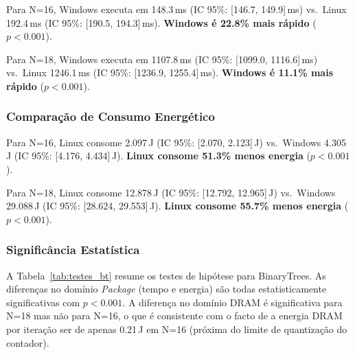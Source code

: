 \documentclass[12pt,a4paper]{article}
\begin{document}
Para N=16, Windows executa em 148.3\,ms (IC 95\%: [146.7, 149.9]\,ms) vs.\
Linux 192.4\,ms (IC 95\%: [190.5, 194.3]\,ms).
\textbf{Windows é 22.8\% mais rápido} ($p < 0.001$).

Para N=18, Windows executa em 1107.8\,ms (IC 95\%: [1099.0, 1116.6]\,ms) vs.\
Linux 1246.1\,ms (IC 95\%: [1236.9, 1255.4]\,ms).
\textbf{Windows é 11.1\% mais rápido} ($p < 0.001$).

\subsubsection{Comparação de Consumo Energético}

Para N=16, Linux consome 2.097\,J (IC 95\%: [2.070, 2.123]\,J) vs.\ Windows
4.305\,J (IC 95\%: [4.176, 4.434]\,J).
\textbf{Linux consome 51.3\% menos energia} ($p < 0.001$).

Para N=18, Linux consome 12.878\,J (IC 95\%: [12.792, 12.965]\,J) vs.\ Windows
29.088\,J (IC 95\%: [28.624, 29.553]\,J).
\textbf{Linux consome 55.7\% menos energia} ($p < 0.001$).

\subsubsection{Significância Estatística}

A Tabela~\ref{tab:testes_bt} resume os testes de hipótese para BinaryTrees.
As diferenças no domínio \textit{Package} (tempo e energia) são todas
estatisticamente significativas com $p < 0.001$.
A diferença no domínio DRAM é significativa para N=18 mas não para N=16, o
que é consistente com o facto de a energia DRAM por iteração ser de apenas
0.21\,J em N=16 (próxima do limite de quantização do contador).
\end{document}
